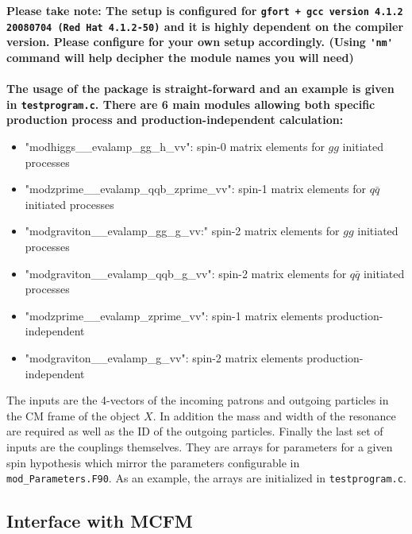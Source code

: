\documentclass[aps,superscriptaddress,nofootinbib]{revtex4}
\begin{document}
\noindent
\bf Please take note: The setup is configured for \verb|gfort + gcc version 4.1.2 20080704 (Red Hat 4.1.2-50)| and it is highly dependent on the compiler version.  Please configure for your own setup accordingly.  {\rm (Using \verb|'nm'| command will help decipher the module names you will need)}\\
\\
\rm
\noindent
The usage of the package is straight-forward and an example is given in \verb|testprogram.c|.  
There are 6 main modules allowing both specific production process and production-independent calculation:
\begin{itemize}
\item "modhiggs\_\_evalamp\_gg\_h\_vv": spin-0 matrix elements for $gg$ initiated processes
\item "modzprime\_\_evalamp\_qqb\_zprime\_vv": spin-1 matrix elements for $q\bar{q}$ initiated processes
\item "modgraviton\_\_evalamp\_gg\_g\_vv:" spin-2 matrix elements for $gg$ initiated processes
\item "modgraviton\_\_evalamp\_qqb\_g\_vv": spin-2 matrix elements for $q\bar{q}$ initiated processes
\item "modzprime\_\_evalamp\_zprime\_vv": spin-1 matrix elements production-independent
\item "modgraviton\_\_evalamp\_g\_vv": spin-2 matrix elements production-independent

\end{itemize}

The inputs are the 4-vectors of the incoming patrons and outgoing particles in the CM frame of the object $X$.  
In addition the mass and width of the resonance are required as well as the ID of the outgoing particles.  
Finally the last set of inputs are the couplings themselves.  They are arrays for parameters for a given spin hypothesis
which mirror the parameters configurable in \verb|mod_Parameters.F90|.  
As an example, the arrays are initialized in \verb|testprogram.c|.

\subsection{Interface with MCFM}
\end{document}
